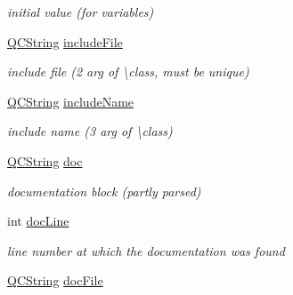 \begin{DoxyCompactItemize}
\begin{DoxyCompactList}\small\item\em initial value (for variables) \end{DoxyCompactList}\item 
\hypertarget{class_entry_acfe66de2209d5fd9ea9f104c3062456b}{\hyperlink{class_q_c_string}{Q\-C\-String} \hyperlink{class_entry_acfe66de2209d5fd9ea9f104c3062456b}{include\-File}}\label{class_entry_acfe66de2209d5fd9ea9f104c3062456b}

\begin{DoxyCompactList}\small\item\em include file (2 arg of \textbackslash{}class, must be unique) \end{DoxyCompactList}\item 
\hypertarget{class_entry_ab79d462c125865b06a1d6f9ee3e66260}{\hyperlink{class_q_c_string}{Q\-C\-String} \hyperlink{class_entry_ab79d462c125865b06a1d6f9ee3e66260}{include\-Name}}\label{class_entry_ab79d462c125865b06a1d6f9ee3e66260}

\begin{DoxyCompactList}\small\item\em include name (3 arg of \textbackslash{}class) \end{DoxyCompactList}\item 
\hypertarget{class_entry_a9910424bf5401d657c3b3fdff6fcc152}{\hyperlink{class_q_c_string}{Q\-C\-String} \hyperlink{class_entry_a9910424bf5401d657c3b3fdff6fcc152}{doc}}\label{class_entry_a9910424bf5401d657c3b3fdff6fcc152}

\begin{DoxyCompactList}\small\item\em documentation block (partly parsed) \end{DoxyCompactList}\item 
\hypertarget{class_entry_a6abf8fcedd015c9c2e235d332d2bdb9b}{int \hyperlink{class_entry_a6abf8fcedd015c9c2e235d332d2bdb9b}{doc\-Line}}\label{class_entry_a6abf8fcedd015c9c2e235d332d2bdb9b}

\begin{DoxyCompactList}\small\item\em line number at which the documentation was found \end{DoxyCompactList}\item 
\hypertarget{class_entry_a9e442ea1f041f60c49f78a7716ef5e20}{\hyperlink{class_q_c_string}{Q\-C\-String} \hyperlink{class_entry_a9e442ea1f041f60c49f78a7716ef5e20}{doc\-File}}\label{class_entry_a9e442ea1f041f60c49f78a7716ef5e20}


\end{DoxyCompactItemize}
